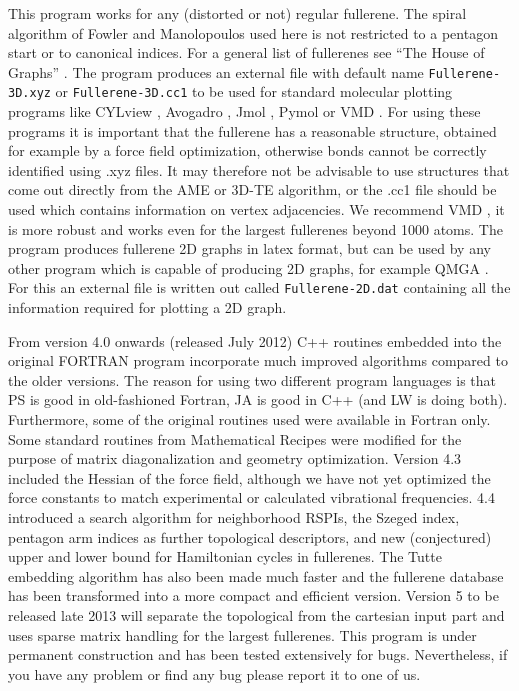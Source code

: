 \documentclass[article,a4paper,twoside]{memoir}
\newcommand{\filename}[1]{\texttt{#1}}
\begin{document}
This program works for any (distorted or not) regular fullerene. The spiral algorithm of Fowler and Manolopoulos used here \cite{Atlas}
is not restricted to a pentagon start or to canonical indices. For a general list of fullerenes see ``The House of Graphs'' \cite{HouseofGraphs}. 
The program produces an external file with default name \filename{Fullerene-3D.xyz} or \filename{Fullerene-3D.cc1} to be used for standard molecular plotting programs
like CYLview \cite{CYLview}, Avogadro \cite{Avogadro}, Jmol \cite{JMol}, Pymol \cite{Pymol} or VMD \cite{vmd}.  For using these programs 
it is important that the fullerene has a reasonable structure, obtained for example by a force field 
optimization, otherwise bonds cannot be correctly identified using .xyz files. It may therefore not be advisable to use structures that come out directly from
the AME or 3D-TE algorithm, or the .cc1 file should be used which contains information on vertex adjacencies. 
We recommend VMD \cite{vmd}, it is more robust and works even for the largest fullerenes beyond 1000 atoms. The program produces fullerene 2D graphs 
in latex format, but can be used by any other program which is capable of producing 2D graphs, for example QMGA \cite{Gabriel2008}. 
For this an external file is written out called \filename{Fullerene-2D.dat} containing all the information required for plotting a 2D graph.

From version 4.0 onwards (released July 2012) C++ routines embedded into the original FORTRAN program incorporate
much improved algorithms compared to the older versions. The reason for using two different program languages is
that PS is good in old-fashioned Fortran, JA is good in C++ (and LW is doing both).  Furthermore, some of the original routines used were available 
in Fortran only. Some standard routines from Mathematical Recipes were modified for the purpose of matrix diagonalization 
and geometry optimization. Version 4.3 included the Hessian of the force field, although 
we have not yet optimized the force constants to match experimental or calculated vibrational frequencies.
4.4 introduced a search algorithm for neighborhood RSPIs, the Szeged index, pentagon arm indices as further topological descriptors,
and new (conjectured) upper and lower bound for Hamiltonian cycles in fullerenes.
The Tutte embedding algorithm has also been made much faster and the fullerene database has been transformed into a more compact and efficient version.
Version 5 to be released late 2013 will separate the topological from the cartesian input part and uses sparse matrix handling for the
largest fullerenes. This program is under permanent construction and has been tested extensively for bugs.
Nevertheless, if you have any problem or find any bug please report it to one of us.
\end{document}
